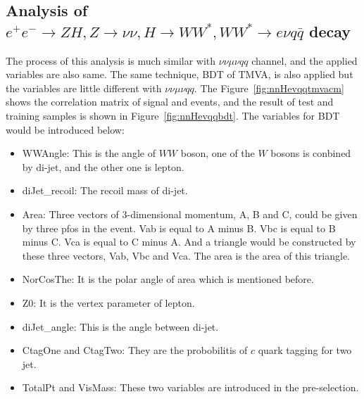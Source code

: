 \documentclass[11pt,a4paper]{cepcnote}
\begin{document}
\subsection{Analysis of $e^+e^-\rightarrow ZH, Z\rightarrow \nu\nu, H\rightarrow WW^*, WW^*\rightarrow e\nu q\bar{q}$ decay}
The process of this analysis is much similar with $\nu\nu\mu\nu qq$ channel, and the applied variables are also same. 
The same technique, BDT of TMVA, is also applied but the variables are little different with $\nu\nu\mu\nu qq$. 
The Figure~\ref{fig:nnHevqqtmvacm} shows the correlation matrix of signal and events,
and the result of test and training samples is shown in Figure~\ref{fig:nnHevqqbdt}.
The variables for BDT would be introduced below:
\begin{itemize}
	\item WWAngle: This is the angle of $WW$ boson, one of the $W$ bosons is conbined by di-jet, and the other one is lepton.
	\item diJet\_recoil: The recoil mass of di-jet.
	\item Area: Three vectors of 3-dimensional momentum, A, B and C, could be given by three pfos in the event.
		Vab is equal to A minus B. Vbc is equal to B minus C. Vca is equal to C minus A.
		And a triangle would be constructed by these three vectors, Vab, Vbc and Vca. The area is the area of this triangle.
	\item NorCosThe: It is the polar angle of area which is mentioned before. 
	\item Z0: It is the vertex parameter of lepton.
	\item diJet\_angle: This is the angle between di-jet.
	\item CtagOne and CtagTwo: They are the probobilitis of $c$ quark tagging for two jet.
	\item TotalPt and VisMass: These two variables are introduced in the pre-selection.
\end{itemize}
\end{document}
